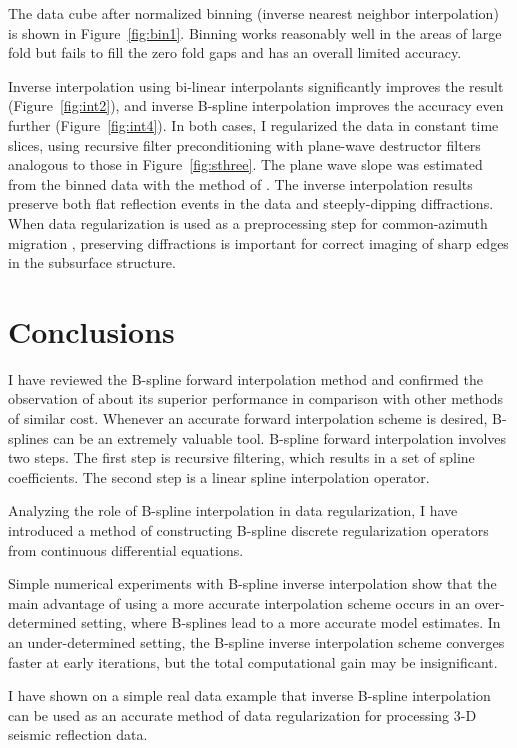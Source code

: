 
The data cube after normalized binning (inverse nearest neighbor
interpolation) is shown in Figure~\ref{fig:bin1}.  Binning works
reasonably well in the areas of large fold but fails to fill the zero
fold gaps and has an overall limited accuracy.


Inverse interpolation using bi-linear interpolants significantly
improves the result (Figure~\ref{fig:int2}), and inverse B-spline
interpolation improves the accuracy even further
(Figure~\ref{fig:int4}). In both cases, I regularized the data in
constant time slices, using recursive filter preconditioning with
plane-wave destructor filters analogous to those in
Figure~\ref{fig:sthree}. The plane wave slope was estimated from the
binned data with the method of \cite{Fomel.sep.105.sergey1}.  The
inverse interpolation results preserve both flat reflection events in
the data and steeply-dipping diffractions. When data regularization is
used as a preprocessing step for common-azimuth migration
\cite[]{GEO61-06-18221832}, preserving diffractions is important for
correct imaging of sharp edges in the subsurface structure.



\section{Conclusions}

I have reviewed the B-spline forward interpolation method and
confirmed the observation of \cite{handbook} about its superior
performance in comparison with other methods of similar cost. Whenever
an accurate forward interpolation scheme is desired, B-splines can be
an extremely valuable tool. B-spline forward interpolation involves
two steps. The first step is recursive filtering, which results in a
set of spline coefficients. The second step is a linear spline
interpolation operator.
\par
Analyzing the role of B-spline interpolation in data regularization, I
have introduced a method of constructing B-spline discrete
regularization operators from continuous differential equations.
\par
Simple numerical experiments with B-spline inverse interpolation show
that the main advantage of using a more accurate interpolation scheme
occurs in an over-determined setting, where B-splines lead to a more
accurate model estimates. In an under-determined setting, the B-spline
inverse interpolation scheme converges faster at early iterations, but
the total computational gain may be insignificant.
\par
I have shown on a simple real data example that inverse B-spline
interpolation can be used as an accurate method of data regularization
for processing 3-D seismic reflection data.

